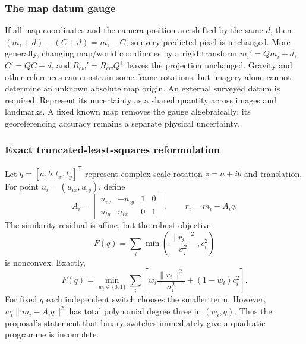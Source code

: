 \subsubsection{The map datum gauge}

If all map coordinates and the camera position are shifted by the same
$d$, then $(m_i+d)-(C+d)=m_i-C$, so every predicted pixel is unchanged.
More generally, changing map/world coordinates by a rigid transform
$m_i'=Qm_i+d$, $C'=QC+d$, and $R_{cw}'=R_{cw}Q^{\mathsf T}$ leaves
the projection unchanged. Gravity and other references can constrain
some frame rotations, but imagery alone cannot determine an unknown
absolute map origin. An external surveyed datum is required.
Represent its uncertainty as a shared quantity across images and
landmarks. A fixed known map removes the gauge algebraically; its
georeferencing accuracy remains a separate physical uncertainty.

\subsubsection{Exact truncated-least-squares reformulation}

Let $q=[a,b,t_x,t_y]^{\mathsf T}$ represent complex scale-rotation
$z=a+ib$ and translation. For point $u_i=(u_{ix},u_{iy})$, define
\begin{equation}
 A_i=\begin{bmatrix}u_{ix}&-u_{iy}&1&0\\
                       u_{iy}&u_{ix}&0&1\end{bmatrix},\qquad
 r_i=m_i-A_iq.
\end{equation}
The similarity residual is affine, but the robust objective
\begin{equation}
 F(q)=\sum_i\min\left(\frac{\|r_i\|^2}{\sigma_i^2},c_i^2\right)
\end{equation}
is nonconvex. Exactly,
\begin{equation}
 F(q)=\min_{w_i\in\{0,1\}}\sum_i
       \left[w_i\frac{\|r_i\|^2}{\sigma_i^2}+(1-w_i)c_i^2\right].
\end{equation}
For fixed $q$ each independent switch chooses the smaller term. However,
$w_i\|m_i-A_iq\|^2$ has total polynomial degree three in $(w_i,q)$.
Thus the proposal's statement that binary switches immediately give a
quadratic programme is incomplete.

